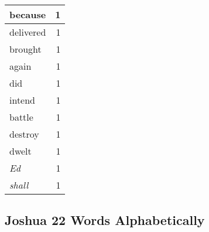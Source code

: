 \begin{center}
\begin{longtable}{l|r}
because & 1\\ \hline 
delivered & 1\\ \hline 
brought & 1\\ \hline 
again & 1\\ \hline 
did & 1\\ \hline 
intend & 1\\ \hline 
battle & 1\\ \hline 
destroy & 1\\ \hline 
dwelt & 1\\ \hline 
\emph{Ed} & 1\\ \hline 
\emph{shall} & 1\\ \hline 
\end{longtable}
\end{center}





\subsection{Joshua 22 Words Alphabetically}


\normalsize
 
